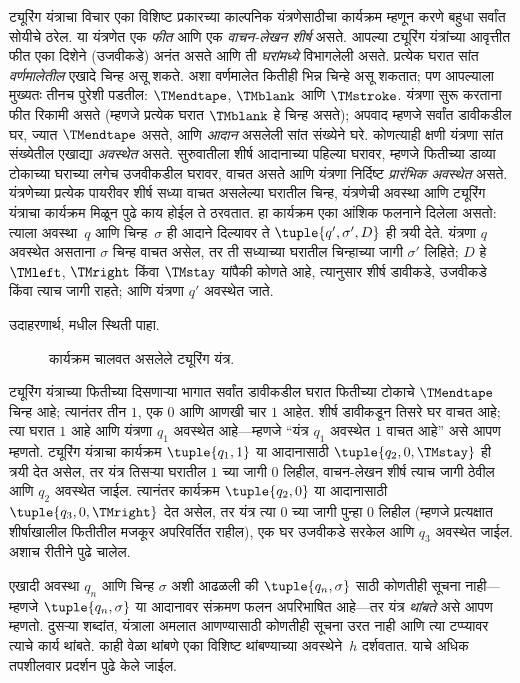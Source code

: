 \documentclass[../../../include/open-logic-section]{subfiles}
\begin{document}
\begin{explain}
ट्यूरिंग यंत्राचा विचार एका विशिष्ट प्रकारच्या काल्पनिक यंत्रणेसाठीचा
कार्यक्रम म्हणून करणे बहुधा सर्वांत सोयीचे ठरेल. या यंत्रणेत एक
\emph{फीत} आणि एक \emph{वाचन-लेखन शीर्ष} असते. आपल्या ट्यूरिंग
यंत्रांच्या आवृत्तीत फीत एका दिशेने (उजवीकडे) अनंत असते आणि ती
\emph{घरांमध्ये} विभागलेली असते. प्रत्येक घरात सांत \emph{वर्णमालेतील}
एखादे चिन्ह असू शकते. अशा वर्णमालेत कितीही भिन्न चिन्हे असू शकतात;
पण आपल्याला मुख्यतः तीनच पुरेशी पडतील: $\TMendtape$, $\TMblank$ आणि
$\TMstroke$. यंत्रणा सुरू करताना फीत रिकामी असते (म्हणजे प्रत्येक घरात
$\TMblank$ हे चिन्ह असते); अपवाद म्हणजे सर्वांत डावीकडील घर, ज्यात
$\TMendtape$ असते, आणि \emph{आदान} असलेली सांत संख्येने घरे. कोणत्याही
क्षणी यंत्रणा सांत संख्येतील एखाद्या \emph{अवस्थेत} असते. सुरुवातीला
शीर्ष आदानाच्या पहिल्या घरावर, म्हणजे फितीच्या डाव्या टोकाच्या
घराच्या लगेच उजवीकडील घरावर, वाचत असते आणि यंत्रणा निर्दिष्ट
\emph{प्रारंभिक अवस्थेत} असते. यंत्रणेच्या प्रत्येक पायरीवर शीर्ष
सध्या वाचत असलेल्या घरातील चिन्ह, यंत्रणेची अवस्था आणि ट्यूरिंग
यंत्राचा कार्यक्रम मिळून पुढे काय होईल ते ठरवतात. हा कार्यक्रम एका
आंशिक फलनाने दिलेला असतो: त्याला अवस्था~$q$ आणि चिन्ह~$\sigma$ ही
आदाने दिल्यावर ते $\tuple{q', \sigma',
  D}$ ही त्रयी देते. यंत्रणा $q$ अवस्थेत असताना $\sigma$ चिन्ह
वाचत असेल, तर ती सध्याच्या घरातील चिन्हाच्या जागी $\sigma'$ लिहिते;
$D$ हे $\TMleft$, $\TMright$ किंवा $\TMstay$ यांपैकी कोणते आहे,
त्यानुसार शीर्ष डावीकडे, उजवीकडे किंवा त्याच जागी राहते; आणि यंत्रणा
$q'$ अवस्थेत जाते.
%

उदाहरणार्थ,  मधील स्थिती पाहा.
\begin{figure}
  \caption{कार्यक्रम चालवत असलेले ट्यूरिंग यंत्र.}
\end{figure}
ट्यूरिंग यंत्राच्या फितीच्या दिसणाऱ्या भागात सर्वांत डावीकडील घरात
फितीच्या टोकाचे $\TMendtape$ चिन्ह आहे; त्यानंतर तीन $1$, एक $0$ आणि
आणखी चार $1$ आहेत. शीर्ष डावीकडून तिसरे घर वाचत आहे; त्या घरात
$1$ आहे आणि यंत्रणा $q_1$ अवस्थेत आहे---म्हणजे ``यंत्र $q_1$
अवस्थेत $1$ वाचत आहे'' असे आपण म्हणतो. ट्यूरिंग यंत्राचा कार्यक्रम
$\tuple{q_1, 1}$ या आदानासाठी $\tuple{q_2,
0, \TMstay}$ ही त्रयी देत असेल, तर यंत्र तिसऱ्या घरातील $1$ च्या
जागी $0$ लिहील, वाचन-लेखन शीर्ष त्याच जागी ठेवील आणि $q_2$
अवस्थेत जाईल. त्यानंतर कार्यक्रम $\tuple{q_2, 0}$ या आदानासाठी
$\tuple{q_3, 0, \TMright}$ देत असेल, तर यंत्र त्या $0$ च्या
जागी पुन्हा $0$ लिहील (म्हणजे प्रत्यक्षात शीर्षाखालील फितीतील मजकूर
अपरिवर्तित राहील), एक घर उजवीकडे सरकेल आणि $q_3$ अवस्थेत जाईल.
अशाच रीतीने पुढे चालेल.

एखादी अवस्था $q_n$ आणि चिन्ह $\sigma$ अशी आढळली की
$\tuple{q_n, \sigma}$ साठी कोणतीही सूचना नाही---म्हणजे
$\tuple{q_n,\sigma}$ या आदानावर संक्रमण फलन अपरिभाषित आहे---तर यंत्र
\emph{थांबते} असे आपण म्हणतो.
दुसऱ्या शब्दांत, यंत्राला अमलात आणण्यासाठी कोणतीही सूचना उरत नाही
आणि त्या टप्प्यावर त्याचे कार्य थांबते. काही वेळा थांबणे एका विशिष्ट
थांबण्याच्या अवस्थेने~$h$ दर्शवतात. याचे अधिक तपशीलवार प्रदर्शन पुढे
केले जाईल.
\end{explain}
\end{document}
